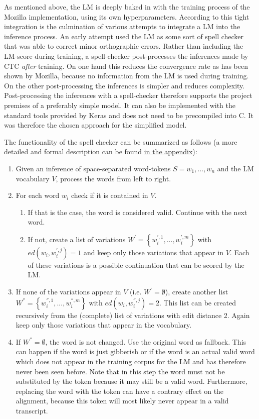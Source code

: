 As mentioned above, the \ac{LM} is deeply baked in with the training process of the Mozilla implementation, using its own hyperparameters. According to \cite{mozillajourney} this tight integration is the culmination of various attempts to integrate a \ac{LM} into the inference process. An early attempt used the \ac{LM} as some sort of spell checker that was able to correct minor orthographic errors. Rather than including the \ac{LM}-score during training, a spell-checker post-processes the inferences made by \ac{CTC} \textit{after} training. On one hand this reduces the convergence rate as has been shown by Mozilla, because no information from the \ac{LM} is used during training. On the other post-processing the inferences is simpler and reduces complexity. Post-processing the inferences with a spell-checker therefore supports the project premises of a preferably simple model. It can also be implemented with the standard tools provided by Keras and does not need to be precompiled into C. It was therefore the chosen approach for the simplified model.

The functionality of the spell checker can be summarized as follows (a more detailed and formal description can be found \hyperref[spellchecker]{in the appendix}): 

\begin{enumerate}
	\item Given an inference of space-separated word-tokens $S = w_1, ..., w_n$ and the \ac{LM} vocabulary $V$, process the words from left to right.
	\item For each word $w_i$ check if it is contained in $V$. 
	\begin{enumerate}
		\item If that is the case, the word is considered valid. Continue with the next word. 
		\item If not, create a list of variations $W^{'} = \left\{ w_i^{',1}, ..., w_i^{',m} \right\}$ with $ed(w_i, w_i^{',j}) = 1$ and keep only those variations that appear in $V$. Each of these variations is a possible continuation that can be scored by the \ac{LM}. 
	\end{enumerate}
	\item If none of the variations appear in $V$ (i.e. $W^{'} = \emptyset$), create another list $W^{''} = \left\{ w_i ^{'',1}, ..., w_i^{'',m} \right\}$ with $ed(w_i, w_i^{'',j}) = 2$. This list can be created recursively from the (complete) list of variations with edit distance 2. Again keep only those variations that appear in the vocabulary.	
	\item If $W^{''} = \emptyset$, the word is not changed. Use the original word as fallback. This can happen if the word is just gibberish or if the word is an actual valid word which does not appear in the training corpus for the \ac{LM} and has therefore never been seen before. Note that in this step the word must not be substituted by the  token because it may still be a valid word. Furthermore, replacing the word with the  token can have a contrary effect on the alignment, because this token will most likely never appear in a valid transcript. 
\end{enumerate}

